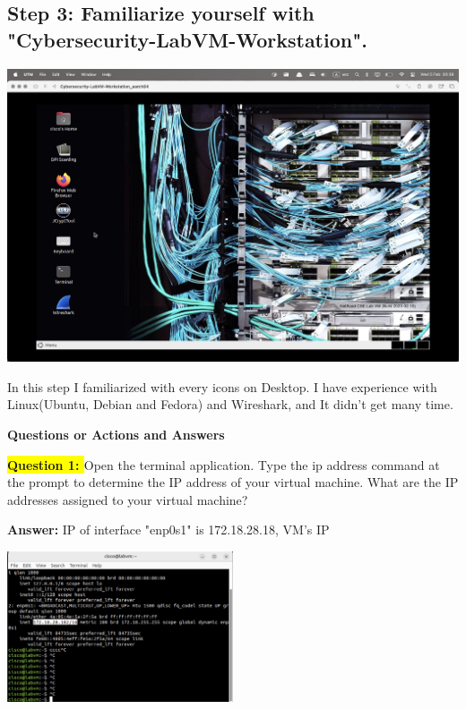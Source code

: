 \documentclass{article}
\begin{document}
\newpage
\subsection*{Step 3: Familiarize yourself with "Cybersecurity-LabVM-Workstation".}

\includegraphics[width=1\textwidth]{Part2/Step2/3.png}

\vspace{1\baselineskip}

In this step I familiarized with every icons on Desktop. I have experience with Linux(Ubuntu, Debian and Fedora) and Wireshark, and It didn't get many time.

\vspace{1\baselineskip}

\textbf{Questions or Actions and Answers} 

\vspace{1\baselineskip}

\textbf{\colorbox{yellow}{Question 1: }} Open the terminal application. Type the ip address command at the prompt to determine the IP address of your virtual machine. What are the IP addresses assigned to your virtual machine? 

\textbf{Answer: }IP of interface "enp0s1" is 172.18.28.18, VM's IP

\includegraphics[width=0.5\textwidth]{Part2/Step2/4.png}
\end{document}
